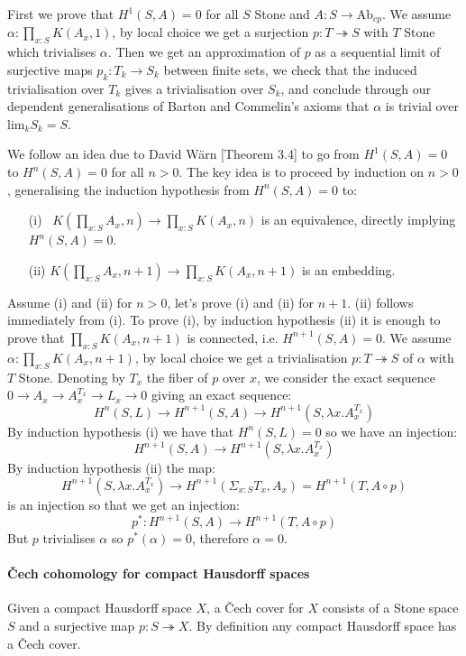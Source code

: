 \documentclass[letterpaper]{../util/easychair}
\begin{document}
First we prove that $H^1(S,A) = 0$ for all $S$ Stone and $A : S\to \mathrm{Ab}_{cp}$. We assume $\alpha:\prod_{x:S}K(A_x,1)$, by local choice we get a surjection $p:T\twoheadrightarrow S$ with $T$ Stone which trivialises $\alpha$. Then we get an approximation of $p$ as a sequential limit of surjective maps $p_k:T_k\to S_k$ between finite sets, we check that the induced trivialisation over $T_k$ gives a trivialisation over $S_k$, and conclude through our dependent generalisations of Barton and Commelin's axioms that $\alpha$ is trivial over $\mathrm{lim}_kS_k =S$.

We follow an idea due to David W\"arn \cite{cech-draft}[Theorem 3.4] to go from $H^1(S,A)=0$ to $H^n(S,A)=0$ for all $n>0$. The key idea is to proceed by induction on $n>0$, generalising the induction hypothesis from $H^n(S,A) = 0$ to: 
\begin{itemize}
\item[(i)~] $ K(\prod_{x:S}A_x,n) \to \prod_{x:S}K(A_x,n)$ is an equivalence, directly implying $H^n(S,A)=0$.
\item[(ii)] $ K(\prod_{x:S}A_x,n+1) \to \prod_{x:S}K(A_x,n+1)$ is an embedding.
\end{itemize}
Assume (i) and (ii) for $n>0$, let's prove (i) and (ii) for $n+1$. (ii) follows immediately from (i). To prove (i), by induction hypothesis (ii) it is enough to prove that $\prod_{x:S}K(A_x,n+1)$ is connected, i.e. $H^{n+1}(S,A)=0$. We assume $\alpha:\prod_{x:S}K(A_x,n+1)$, by local choice we get a trivialisation $p:T\twoheadrightarrow S$ of $\alpha$ with $T$ Stone. Denoting by $T_x$ the fiber of $p$ over $x$, we consider the exact sequence $0\to A_x\to A_x^{T_x}\to L_x\to 0$ giving an exact sequence:
\[H^{n}(S,L)\to H^{n+1}(S,A)\to H^{n+1}(S,\lambda x. A_x^{T_x})\]
By induction hypothesis (i) we have that $H^{n}(S,L) = 0$ so we have an injection:
\[H^{n+1}(S,A)\to H^{n+1}(S,\lambda x. A_x^{T_x})\]
By induction hypothesis (ii) the map: 
\[H^{n+1}(S,\lambda x. A_x^{T_x}) \to H^{n+1}(\Sigma_{x:S}T_x,A_x) = H^{n+1}(T,A\circ p)\]
is an injection so that we get an injection:
\[p^* : H^{n+1}(S,A)\to H^{n+1}(T,A\circ p)\] 
But $p$ trivialises $\alpha$ so $p^*(\alpha)=0$, therefore $\alpha=0$.

\paragraph*{\v{C}ech cohomology for compact Hausdorff spaces}

Given a compact Hausdorff space $X$, a \v{C}ech cover for $X$ consists of a Stone space $S$ and a surjective map $p:S\twoheadrightarrow X$. By definition any compact Hausdorff space has a \v{C}ech cover.
\end{document}

